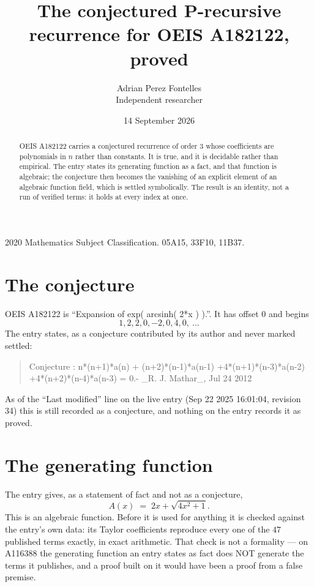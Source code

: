 \documentclass[11pt,a4paper]{article}
\title{The conjectured P-recursive recurrence for OEIS A182122, proved}
\author{Adrian Perez Fontelles\\ \small Independent researcher}
\date{14 September 2026}
\theoremstyle{plain}
\theoremstyle{definition}
\begin{document}
\maketitle

\begin{abstract}
OEIS A182122 carries a conjectured recurrence of order $3$ whose coefficients are polynomials in
$n$ rather than constants. It is true, and it is decidable rather than empirical. The entry
states its generating function as a fact, and that function is algebraic; the conjecture then
becomes the vanishing of an explicit element of an algebraic function field, which is settled
symbolically. The result is an identity, not a run of verified terms: it holds at every index
at once.
\end{abstract}

\noindent\small 2020 Mathematics Subject Classification. 05A15, 33F10, 11B37.\normalsize

\section{The conjecture}

OEIS A182122 is ``Expansion of exp( arcsinh( 2*x ) ).''. It has offset $0$ and begins
\[
1, 2, 2, 0, -2, 0, 4, 0,\ \dots
\]
The entry states, as a conjecture contributed by its author and never marked settled:
\begin{quote}\raggedright\small
Conjecture : n*(n+1)*a(n) + (n+2)*(n-1)*a(n-1) +4*(n+1)*(n-3)*a(n-2) +4*(n+2)*(n-4)*a(n-3) = 0.- \_R. J. Mathar\_, Jul 24 2012
\end{quote}
As of the ``Last modified'' line on the live entry (Sep 22 2025 16:01:04, revision 34)
this is still recorded as a conjecture, and nothing on the entry records it as proved.

\section{The generating function}

The entry gives, as a statement of fact and not as a conjecture,
\[
A(x)\;=\;2 x + \sqrt{4 x^{2} + 1} .
\]
This is an algebraic function. Before it is used for anything it is checked against the entry's
own data: its Taylor coefficients reproduce every one of the $47$ published terms
exactly, in exact arithmetic. That check is not a formality --- on A116388 the generating
function an entry states as fact does NOT generate the terms it publishes, and a proof built on
it would have been a proof from a false premise.
\end{document}
